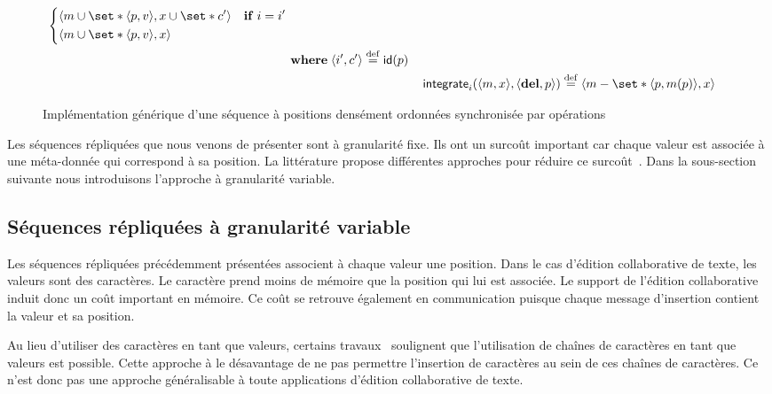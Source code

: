 \begin{figure}[htb]
\begin{align}
\begin{aligned}
\begin{dcases}
    \tuple*{m \cup \set*{\tuple*{p, v}}, x \cup \set*{c'}} & \when i = i'\\
    \tuple*{m \cup \set*{\tuple*{p, v}}, x} &
\end{dcases}\\
&\where \tuple*{i', c'} \defeq \trm{id}(p)
\end{aligned}\label{eq:op-seq-integr-ins}\\
%
&\trm{integrate}_i(\tuple*{m, x}, \tuple*{\textbf{del}, p}) \defeq%
\tuple*{m \sminus \set*{\tuple*{p, m(p)}}, x}%
\label{eq:op-seq-integr-del}
%
\end{align}
\caption{Implémentation générique d'une séquence à positions densément ordonnées synchronisée par opérations}\label{fig:op-densely-id-repseq}
\end{figure}

Les séquences répliquées que nous venons de présenter sont à granularité fixe.
Ils ont un surcoût important car chaque valeur est associée à une méta-donnée qui correspond à sa position.
La littérature propose différentes approches pour réduire ce surcoût~\autocite{ andre_2013_logootsplit, briot_2016_rgasplit,nedelec_2013_lseq,nicolas2020_renaming}.
Dans la sous-section suivante nous introduisons l'approche à granularité variable.

\clearpage
\subsection{Séquences répliquées à granularité variable}\label{subsec:strwise-seq}

Les séquences répliquées précédemment présentées associent à chaque valeur une position.
Dans le cas d'édition collaborative de texte, les valeurs sont des caractères.
Le caractère prend moins de mémoire que la position qui lui est associée.
Le support de l'édition collaborative induit donc un coût important en mémoire.
Ce coût se retrouve également en communication puisque chaque message d'insertion contient la valeur et sa position.

Au lieu d'utiliser des caractères en tant que valeurs, certains travaux~\autocite{oster_2006_woot} soulignent que l'utilisation de chaînes de caractères en tant que valeurs est possible.
Cette approche à le désavantage de ne pas permettre l'insertion de caractères au sein de ces chaînes de caractères.
Ce n'est donc pas une approche généralisable à toute applications d'édition collaborative de texte.

